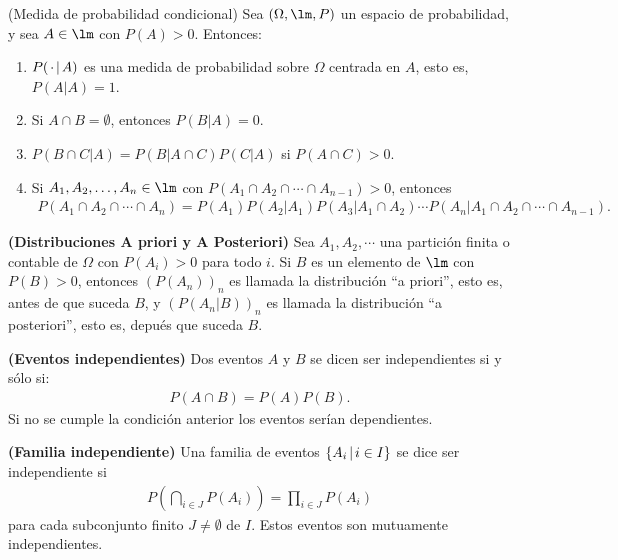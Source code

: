 \begin{theorem}(Medida de probabilidad condicional)
    Sea $(\Omega, \lm, P)$ un espacio de probabilidad, y sea $A\in \lm$ con $P(A)> 0$. Entonces:
    \begin{enumerate}[{\rm 1.}]
        \item $P( \hspace{0.5mm}\cdot\hspace{0.5mm} |\hspace{0.5mm}A)$ es una medida de probabilidad sobre $\Omega$ centrada en $A$, esto es, $P(A|A)=1$.
        \item Si $A\cap B = \emptyset$, entonces $P(B|A)=0$.
        \item $P(B\cap C| A)=P(B|A\cap C)P(C|A)$ si $P(A\cap C)> 0.$
        \item Si $A_1, A_2,\ldots, A_n \in \lm$ con $P(A_1 \cap A_2 \cap \cdots \cap A_{n-1})> 0$, entonces 
        \begin{align*}
            P(A_1 \cap A_2 \cap \cdots \cap A_{n}) = P(A_1)P(A_2|A_1)P(A_3|A_1\cap A_2)\cdots P(A_n|A_1\cap A_2\cap \cdots \cap A_{n-1}).
        \end{align*}
    \end{enumerate}
\end{theorem}

\begin{definition}{\bf (Distribuciones A priori y A Posteriori)}\newline
    Sea $A_1, A_2, \cdots$ una partici\'on finita o contable de $\Omega$ con $P(A_i)>0$ para todo $i$. Si $B$ 
    es un elemento de $\lm$ con $P(B)>0$, entonces $(P(A_n))_{n}$ es llamada la distribuci\'on ``a priori'', esto es, antes de que suceda $B$, 
    y $(P(A_n|B))_{n}$ es llamada la distribuci\'on ``a posteriori'', esto es, depu\'es que suceda $B$.
\end{definition}

\begin{definition}{\bf (Eventos independientes)}
    Dos eventos $A$ y $B$ se dicen ser independientes si y s\'olo si:
    \begin{align*}
        P(A\cap B) = P(A)P(B).
    \end{align*}
    Si no se cumple la condici\'on anterior los eventos ser\'ian dependientes. 
\end{definition}

\begin{definition}{\bf (Familia independiente)}
    Una familia de eventos $\{A_i \hspace{0.5mm}|\hspace{0.5mm} i\in I\}$ se dice ser independiente si 
    \begin{align*}
        P \left( \bigcap_{i\in J} P(A_i)\right) = \prod_{i\in J}P(A_i)
    \end{align*}
    para cada subconjunto finito $J\not=\emptyset$ de $I$. Estos eventos son mutuamente independientes.
\end{definition}

